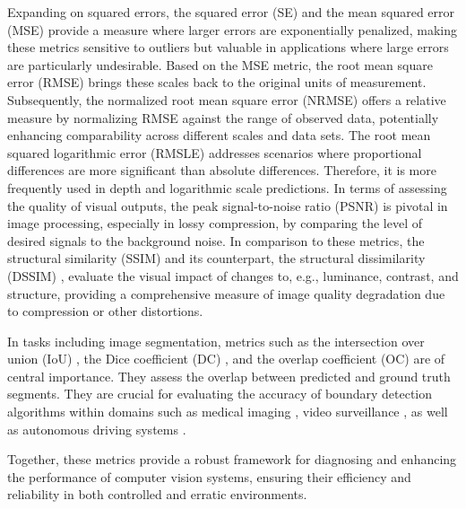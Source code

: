 \documentclass{article}
\begin{document}
Expanding on squared errors, the squared error (SE) \cite{draper1998applied} and the mean squared error (MSE) \cite{bickel2015mathematical} provide a measure where larger errors are exponentially penalized, making these metrics sensitive to outliers but valuable in applications where large errors are particularly undesirable. Based on the MSE metric, the root mean square error (RMSE) \cite{willmott2005advantages, hyndman2006another, pontius2008components} brings these scales back to the original units of measurement. Subsequently, the normalized root mean square error (NRMSE) \cite{chang2004air, kim2005missing} offers a relative measure by normalizing RMSE against the range of observed data, potentially enhancing comparability across different scales and data sets. The root mean squared logarithmic error (RMSLE) \cite{nafees2021predictive} addresses scenarios where proportional differences are more significant than absolute differences. Therefore, it is more frequently used in depth and logarithmic scale predictions. In terms of assessing the quality of visual outputs, the peak signal-to-noise ratio (PSNR) \cite{salomon2004data, huynh2008scope} is pivotal in image processing, especially in lossy compression, by comparing the level of desired signals to the background noise. In comparison to these metrics, the structural similarity (SSIM) \cite{wang2004image, ghodrati2019mr} and its counterpart, the structural dissimilarity (DSSIM) \cite{wang2004image, ghodrati2019mr}, evaluate the visual impact of changes to, e.g., luminance, contrast, and structure, providing a comprehensive measure of image quality degradation due to compression or other distortions.

In tasks including image segmentation, metrics such as the intersection over union (IoU) \cite{jaccard1912distribution, murphy1996finley, rezatofighi2019generalized, zou2023object}, the Dice coefficient (DC) \cite{dice1945measures, sorenson1948method}, and the overlap coefficient (OC) \cite{szymkiewicz1934conlribution, sempson1947holarctic, bell1962mutual, goodall1978sample} are of central importance. They assess the overlap between predicted and ground truth segments. They are crucial for evaluating the accuracy of boundary detection algorithms within domains such as medical imaging \cite{suzuki2017overview, esteva2021deep}, video surveillance \cite{buch2011review, brunetti2018computer}, as well as autonomous driving systems \cite{feng2021review, zablocki2022explainability}.

Together, these metrics provide a robust framework for diagnosing and enhancing the performance of computer vision systems, ensuring their efficiency and reliability in both controlled and erratic environments.
\end{document}
